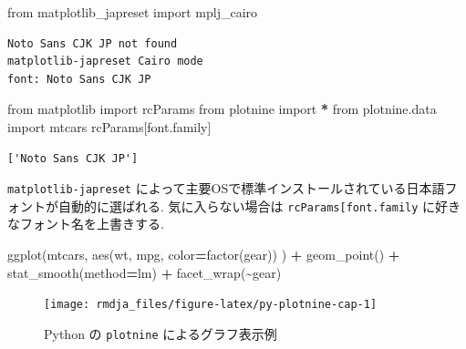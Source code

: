 \documentclass[
]{bxjsbook}
\newenvironment{Shaded}{\begin{snugshade}}{\end{snugshade}}
\newcommand{\ImportTok}[1]{#1}
\newcommand{\NormalTok}[1]{#1}
\newcommand{\OperatorTok}[1]{\textcolor[rgb]{0.81,0.36,0.00}{\textbf{#1}}}
\newcommand{\StringTok}[1]{\textcolor[rgb]{0.31,0.60,0.02}{#1}}
\theoremstyle{definition}
\theoremstyle{definition}
\theoremstyle{definition}
\theoremstyle{remark}
\begin{document}
\begin{Shaded}
\begin{Highlighting}[numbers=left,,]
\ImportTok{from}\NormalTok{ matplotlib\_japreset }\ImportTok{import}\NormalTok{ mplj\_cairo}
\end{Highlighting}
\end{Shaded}

\begin{verbatim}
Noto Sans CJK JP not found
matplotlib-japreset Cairo mode
font: Noto Sans CJK JP
\end{verbatim}

\begin{Shaded}
\begin{Highlighting}[numbers=left,,]
\ImportTok{from}\NormalTok{ matplotlib }\ImportTok{import}\NormalTok{ rcParams}
\ImportTok{from}\NormalTok{ plotnine }\ImportTok{import} \OperatorTok{*}
\ImportTok{from}\NormalTok{ plotnine.data }\ImportTok{import}\NormalTok{ mtcars}
\NormalTok{rcParams[}\StringTok{\textquotesingle{}font.family\textquotesingle{}}\NormalTok{]}
\end{Highlighting}
\end{Shaded}

\begin{verbatim}
['Noto Sans CJK JP']
\end{verbatim}

\texttt{matplotlib-japreset}
によって主要OSで標準インストールされている日本語フォントが自動的に選ばれる.
気に入らない場合は
\texttt{rcParams{[}\textquotesingle{}font.family\textquotesingle{}{]}}
に好きなフォント名を上書きする.



\begin{Shaded}
\begin{Highlighting}[numbers=left,,]
\NormalTok{ggplot(mtcars, aes(}\StringTok{\textquotesingle{}wt\textquotesingle{}}\NormalTok{, }\StringTok{\textquotesingle{}mpg\textquotesingle{}}\NormalTok{, color}\OperatorTok{=}\StringTok{\textquotesingle{}factor(gear)\textquotesingle{}}\NormalTok{)}
\NormalTok{) }\OperatorTok{+}\NormalTok{ geom\_point() }\OperatorTok{+}\NormalTok{ stat\_smooth(method}\OperatorTok{=}\StringTok{\textquotesingle{}lm\textquotesingle{}}\NormalTok{) }\OperatorTok{+}\NormalTok{ facet\_wrap(}\StringTok{\textquotesingle{}\textasciitilde{}gear\textquotesingle{}}\NormalTok{)}
\end{Highlighting}
\end{Shaded}

\begin{figure}

{\centering \texttt{[image: rmdja\_files/figure-latex/py-plotnine-cap-1]} 

}

\caption{Python の \texttt{plotnine} によるグラフ表示例}\label{fig:py-plotnine-cap}
\end{figure}
\end{document}
